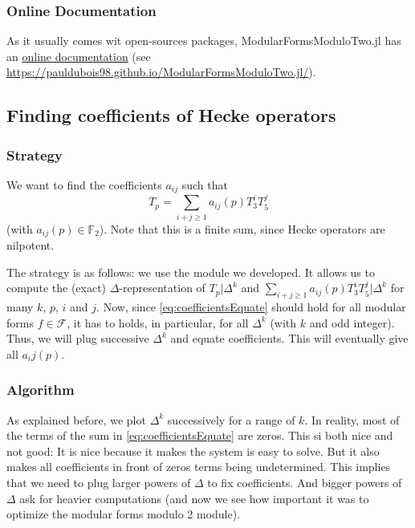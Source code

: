 \subsubsection{Online Documentation}
As it usually comes wit open-sources packages, ModularFormsModuloTwo.jl has an \href{https://pauldubois98.github.io/ModularFormsModuloTwo.jl/}{online documentation} (see \url{https://pauldubois98.github.io/ModularFormsModuloTwo.jl/}).




\subsection{Finding coefficients of Hecke operators}
\subsubsection{Strategy}
We want to find the coefficients $a_{ij}$ such that 
\begin{equation}
\label{eq:coefficientsEquate}
	T_p = \sum_{i+j \geq 1} a_{ij}(p)T_3^iT_5^j \tag{$*$}
\end{equation}
(with $a_{ij}(p) \in \mathbb{F}_2$).
Note that this is a finite sum, since Hecke operators are nilpotent.

The strategy is as follows: we use the module we developed.
It allows us to compute the (exact) $\Delta$-representation of $T_p|\Delta^k$ and $\sum_{i+j \geq 1} a_{ij}(p) T_3^iT_5^j|\Delta^k$ for many $k$, $p$, $i$ and $j$.
Now, since \eqref{eq:coefficientsEquate} should hold for all modular forms $f \in \mathcal{F}$, it has to holds, in particular, for all $\Delta^k$ (with $k$ and odd integer).
Thus, we will plug successive $\Delta^k$ and equate coefficients.
This will eventually give all $a_ij(p)$.

\subsubsection{Algorithm}
As explained before, we plot $\Delta^k$ successively for a range of $k$.
In reality, most of the terms of the sum in \ref{eq:coefficientsEquate} are zeros.
This si both nice and not good:
It is nice because it makes the system is easy to solve.
But it also makes all coefficients in front of zeros terms being undetermined.
This implies that we need to plug larger powers of $\Delta$ to fix coefficients.
And bigger powers of $\Delta$ ask for heavier computations (and now we see how important it was to optimize the modular forms modulo 2 module).

